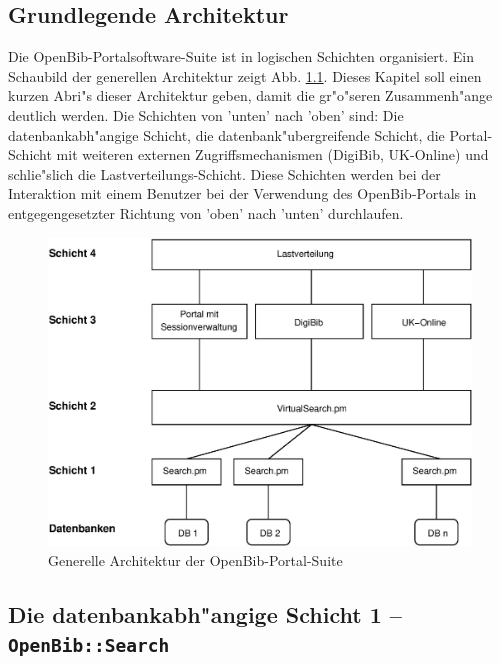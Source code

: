 \documentclass[11pt, twoside, a4paper, BCOR8mm, DIV12, bibtotoc,idxtotoc]{scrbook}
\begin{document}
\begin{itemize}
\chapter{Grundlegende Architektur}

Die OpenBib-Portalsoftware-Suite ist in logischen Schichten
organisiert. Ein Schaubild der ge\-ne\-rellen Architektur zeigt Abb.
\ref{bild:architektur}. Dieses Kapitel soll einen kurzen Abri"s dieser
Architektur geben, damit die gr"o"seren Zusammenh"ange deutlich
werden. Die Schichten von 'unten' nach 'oben' sind: Die
datenbankabh"angige Schicht, die datenbank"ubergreifende Schicht, die
Portal-Schicht mit weiteren externen Zugriffsmechanismen (DigiBib,
UK-Online) und schlie"slich die Lastverteilungs-Schicht. Diese
Schichten werden bei der Interaktion mit einem Benutzer bei der
Verwendung des OpenBib-Portals in entgegengesetzter Richtung von
'oben' nach 'unten' durchlaufen.


\begin{figure}
\begin{shadowenv}
  \vspace{4mm}
    \centering \begin{minipage}[b]{1.0\textwidth}
      \centering \includegraphics[width=12cm]{schicht04.eps}
    \end{minipage}
    \caption{Generelle Architektur der OpenBib-Portal-Suite}
  \label{bild:architektur}
  \vspace{3mm}
\end{shadowenv}
\end{figure}

\section{Die datenbankabh"angige Schicht 1 -- \texttt{OpenBib::Search}}


\end{itemize}
\end{document}
